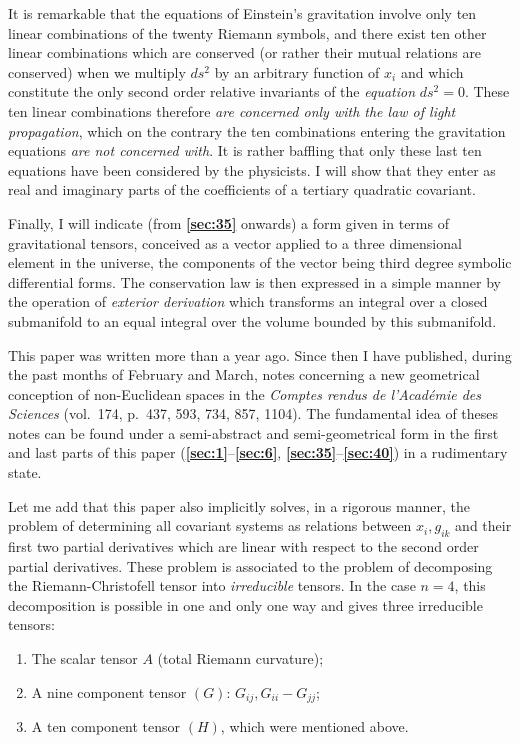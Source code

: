 \documentclass[leqno,12pt]{article}
\theoremstyle{shape1}
\theoremstyle{shape0}
\theoremstyle{shape2}
\theoremstyle{definition}
\begin{document}
It is remarkable that the equations of Einstein's gravitation involve only ten linear combinations of the twenty Riemann symbols, and there exist ten other linear combinations which are conserved (or rather their mutual relations are conserved) when we multiply $ds^{2}$ by an arbitrary function of $x_{i}$ and which constitute the only second order relative invariants of the \emph{equation} $ds^{2}=0$. These ten linear combinations therefore \emph{are concerned only with the law of light propagation}, which on the contrary the ten combinations entering the gravitation equations \emph{are not concerned with}. It is rather baffling that only these last ten equations have been considered by the physicists. I will show that they enter as real and imaginary parts of the coefficients of a tertiary quadratic covariant.

Finally, I will indicate (from \textsection\textbf{\ref{sec:35}} onwards) a form given in terms of gravitational tensors, conceived as a vector applied to a three dimensional element in the universe, the components of the vector being third degree symbolic differential forms. The conservation law is then expressed in a simple manner by the operation of \emph{exterior derivation} which transforms an integral over a closed submanifold to an equal integral over the volume bounded by this submanifold.

\mbox{}

This paper was written more than a year ago. Since then I have published, during the past months of February and March, notes concerning a new geometrical conception of non-Euclidean spaces in the \emph{Comptes rendus de l'Académie des Sciences} (vol.\ 174, p.\ 437, 593, 734, 857, 1104). The fundamental idea of theses notes can be found under a semi-abstract and semi-geometrical form in the first and last parts of this paper (\textsection\textbf{\ref{sec:1}}--\textbf{\ref{sec:6}}, \textsection\textbf{\ref{sec:35}}--\textbf{\ref{sec:40}}) in a rudimentary state.

Let me add that this paper also implicitly solves, in a rigorous manner, the problem of determining all covariant systems as relations between $x_{i}, g_{ik}$ and their first two partial derivatives which are linear with respect to the second order partial derivatives. These problem is associated to the problem of decomposing the Riemann-Christofell tensor into \emph{irreducible} tensors. In the case $n=4$, this decomposition is possible in one and only one way and gives three irreducible tensors:
\begin{enumerate}
\item The scalar tensor $A$ (total Riemann curvature);
\item  A nine component tensor $(G)$: $G_{ij}, G_{ii}-G_{jj}$;
\item A ten component tensor $(H)$, which were mentioned above.
\end{enumerate}
\end{document}
